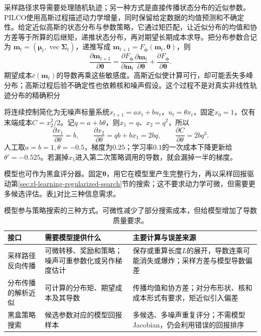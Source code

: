 采样路径求导需要处理随机轨迹；另一种方式是直接传播状态分布的近似参数。PILCO使用高斯过程描述动力学增量，同时保留给定数据的均值预测和不确定性。给定近似高斯的状态分布与参数策略，它通过矩匹配，让近似分布的均值和协方差等于所算的后继矩，递推状态分布，再对期望长期成本求导。把分布参数合记为
$\bm m_t=(\bm\mu_t,\operatorname{vec}\bm\Sigma_t)$，递推写成
$\bm m_{t+1}=F_{\bm\phi}(\bm m_t,\bm\theta)$，则
\[
 \frac{\partial\bm m_{t+1}}{\partial\bm\theta}
  =\frac{\partial F_{\bm\phi}}{\partial\bm m_t}
       \frac{\partial\bm m_t}{\partial\bm\theta}
       +\frac{\partial F_{\bm\phi}}{\partial\bm\theta}.
\]
期望成本$\bar c(\bm m_t)$的导数再乘这些敏感度。高斯近似使计算可行，却可能丢失多峰分布；高斯过程后验不确定性也依赖核和噪声假设。这个过程不是对真实非线性轨迹分布的精确积分

\begin{example}[两步模型梯度]
  \label{ex:rl-learning-two-step-gradient}
  将连续控制简化为无噪声标量系统$x_{t+1}=ax_t+bu_t$，$u_t=\theta x_t$，固定$x_0=1$，仅有末端成本$C=x_2^2/2$。记$q=a+b\theta$，则$x_1=q$、$x_2=q^2$，所以
  \[
    \frac{\partial x_1}{\partial\theta}=b,\qquad
    \frac{\partial x_2}{\partial\theta}
       =q b+b x_1=2bq,\qquad
    \frac{\partial C}{\partial\theta}=2bq^3.
  \]
  人工取$a=b=1,\theta=-0.5$，梯度为$0.25$；学习率$0.1$的一次成本下降更新给$\theta'=-0.525$。若漏掉$x_1$进入第二次策略调用的导数，就会漏掉一半的梯度。
\end{example}

模型也可作为黑盒评分器。固定$\bm\theta$，用它在模型里产生完整行为，再以采样回报驱动第\ref{sec:rl-learning-regularized-search}节的搜索；这不要求动力学可微，但需要更多候选评估。表\ref{tab:rl-learning-model-gradient-interfaces}对比三种信息需求。

\begin{table}[t]
  \centering
  \small
  \begin{tabularx}{\linewidth}{>{\raggedright\arraybackslash}p{25mm} >{\raggedright\arraybackslash}X >{\raggedright\arraybackslash}X}
    \toprule
    接口 & 需要模型提供什么 & 主要计算与误差来源 \\
    \midrule
    采样路径反向传播 & 可微转移、奖励和策略；噪声可重参数化或另作梯度估计 & 保存或重算长度$L$的展开，导数连乘可能消失或爆炸；采样方差与模型导数偏差 \\
    分布传播的解析近似 & 可计算的分布矩、期望成本及其导数 & 传播均值和协方差；对分布形状、核和成本形式有要求，矩近似引入偏差 \\
    黑盒策略搜索 & 候选参数对应的模型回报样本 & 多候选、多噪声重复评分；不需模型Jacobian，仍会利用错误的回报排序 \\
    \bottomrule
  \end{tabularx}
  \caption{模型参与策略搜索的三种方式。可微性减少了部分搜索成本，但给模型增加了导数质量要求。}
  \label{tab:rl-learning-model-gradient-interfaces}
\end{table}

